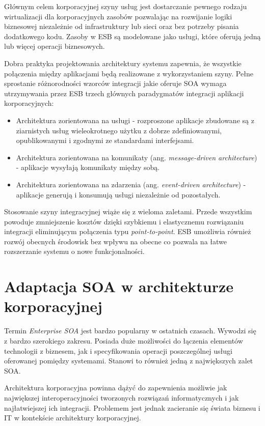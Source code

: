 Głównym celem korporacyjnej szyny usług jest dostarczanie pewnego rodzaju wirtualizacji dla korporacyjnych zasobów pozwalając na rozwijanie logiki biznesowej niezależnie od infrastruktury lub sieci oraz bez potrzeby pisania dodatkowego kodu. Zasoby w ESB są modelowane jako usługi, które oferują jedną lub więcej operacji biznesowych. \cite{IBMRBSoaPat}

Dobra praktyka projektowania architektury systemu zapewnia, że wszystkie połączenia między aplikacjami będą realizowane z wykorzystaniem szyny. \cite{PlatIntGor} Pełne sprostanie różnorodności wzorców integracji jakie oferuje SOA wymaga utrzymywania przez ESB trzech głównych paradygmatów integracji aplikacji korporacyjnych:
\begin{itemize}
\item{Architektura zorientowana na usługi - rozproszone aplikacje zbudowane są z ziarnistych usług wieleokrotnego użytku z dobrze zdefiniowanymi, opublikowanymi i zgodnymi ze standardami interfejsami.}
\item{Architektura zorientowana na komunikaty (ang. \textit{message-driven architecture}) - aplikacje wysyłają komunikaty między sobą.}
\item{Architektura zorientowana na zdarzenia (ang. \textit{event-driven architecture}) - aplikacje generują i konsumują usługi niezależnie od pozostałych.} \cite{IBMRBSoaPat}
\end{itemize}

Stosowanie szyny integracyjnej wiąże się z wieloma zaletami. Przede wszystkim powoduje zmniejszenie kosztów dzięki szybkiemu i elastycznemu rozwiązaniu integracji eliminującym połączenia typu \textit{point-to-point}. ESB umożliwia również rozwój obecnych środowisk bez wpływu na obecne co pozwala na łatwe rozszerzanie systemu o nowe funkcjonalności. \cite{IBMRBSoaPat}

\section{Adaptacja SOA w architekturze korporacyjnej}
Termin \emph{Enterprise SOA} jest bardzo popularny w ostatnich czasach. Wywodzi się z bardzo szerokiego zakresu. Posiada duże możliwości do łączenia elementów technologii z biznesem, jak i specyfikowania operacji poszczególnej usługi oferowanej pomiędzy systemami. Stanowi to również jedną z największych zalet SOA. \cite{EntSOACoryCanSoaML}

Architektura korporacyjna powinna dążyć do zapewnienia możliwie jak największej interoperacyjności tworzonych rozwiązań informatycznych i jak najłatwiejszej ich integracji. Problemem jest jednak zacieranie się świata biznesu i IT w kontekście architektury korporacyjnej.

